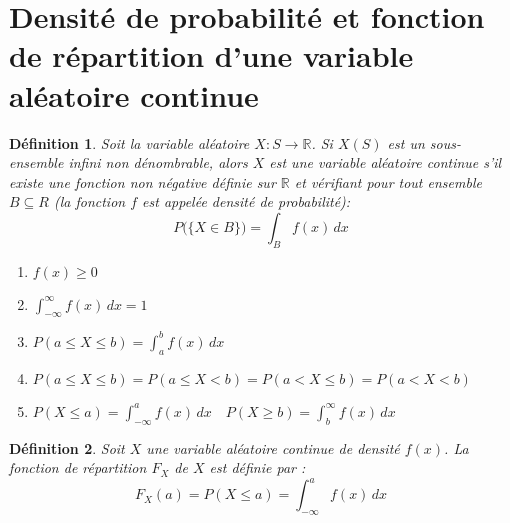 \documentclass{article}
\newtheorem*{mydef}{Définition}
\begin{document}
	\section*{Densité de probabilité et fonction de répartition d'une variable aléatoire continue}
		\begin{mydef}
			Soit la variable aléatoire \(X : S \longrightarrow \mathbb{R}\). Si \(X(S)\) est un sous-ensemble infini non dénombrable, alors \(X\) est une variable aléatoire continue s'il existe une fonction non négative définie sur \(\mathbb{R}\) et vérifiant pour tout ensemble \(B \subseteq R\) (la fonction \(f\) est appelée densité de probabilité):
			\[P\big(\{X\in B\}\big)=\int_B f(x)\,dx\]
			\begin{enumerate}
				\item \(f(x)\geq 0\)
				\item \(\int_{-\infty}^{\infty}f(x)\,dx=1\)
				\item \(P(a\leq X\leq b)=\int_a^b f(x)\,dx\)
				\item \(P(a\leq X\leq b)=P(a\leq X<b)=P(a<X\leq b)=P(a<X<b)\)
				\item \(P(X\leq a)=\int_{-\infty}^a f(x)\,dx\quad P(X\geq b)=\int_b^{\infty}f(x)\,dx\)
			\end{enumerate}
		\end{mydef}
	\begin{mydef}
		Soit \(X\) une variable aléatoire continue de densité \(f(x)\). La fonction de répartition \(F_X\) de \(X\) est définie par :
		\[F_X(a)=P(X\leq a)=\int_{-\infty}^a f(x)\, dx\]
	\end{mydef}
\end{document}

